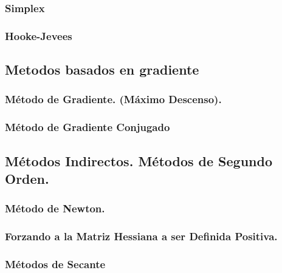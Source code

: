 \documentclass[12pt,letterpaper]{report}
\begin{document}
\subsubsection{Simplex}
\subsubsection{Hooke-Jevees}

\subsection{Metodos basados en gradiente}
\subsubsection{Método de Gradiente. (Máximo Descenso).}
\subsubsection{Método de Gradiente Conjugado}

\subsection {Métodos Indirectos. Métodos de Segundo Orden.}
\subsubsection{Método de Newton.}
\subsubsection{Forzando a la Matriz Hessiana a ser Definida Positiva.}
\subsubsection {Métodos de Secante }
\end{document}
